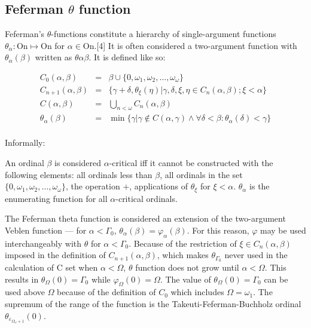 \documentclass[10pt]{article}
\begin{document}
\subsection{Feferman \( \theta \) function}

Feferman's \(\theta\)-functions constitute a hierarchy of single-argument functions \(\theta_\alpha: \text{On} \mapsto \text{On}\) for \(\alpha \in \text{On}\).[4] It is often considered a two-argument function with \(\theta_\alpha(\beta)\) written as \(\theta\alpha\beta\). It is defined like so:

\begin{eqnarray*}
C_0(\alpha, \beta) &=& \beta \cup \{0, \omega_1, \omega_2, \ldots, \omega_\omega\}\\
C_{n+1}(\alpha, \beta) &=& \{\gamma + \delta, \theta_\xi(\eta) | \gamma, \delta, \xi, \eta \in C_n(\alpha, \beta); \xi < \alpha\} \\
C(\alpha, \beta) &=& \bigcup_{n < \omega} C_n (\alpha, \beta) \\
\theta_\alpha(\beta) &=& \min\{\gamma | \gamma \not\in C(\alpha, \gamma) \wedge \forall \delta < \beta: \theta_\alpha(\delta) < \gamma\} \\
\end{eqnarray*}

Informally:

 An ordinal \(\beta\) is considered \(\alpha\)-critical iff it cannot be constructed with the following elements:
 all ordinals less than \(\beta\),
 all ordinals in the set \(\{0, \omega_1, \omega_2, \ldots, \omega_\omega\}\),
 the operation \(+\),
 applications of \(\theta_\xi\) for \(\xi < \alpha\).
 \(\theta_\alpha\) is the enumerating function for all \(\alpha\)-critical ordinals.

The Feferman theta function is considered an extension of the two-argument Veblen function — for \(\alpha < \Gamma_0\), \(\theta_\alpha(\beta) = \varphi_\alpha(\beta)\). For this reason, \(\varphi\) may be used interchangeably with \(\theta\) for \(\alpha < \Gamma_0\). Because of the restriction of \(\xi \in C_n(\alpha, \beta)\) imposed in the definition of \(C_{n+1}(\alpha, \beta)\), which makes \(\theta_{\Gamma_0}\) never used in the calculation of C set when \(\alpha < \Omega\), \(\theta\) function does not grow until \(\alpha < \Omega\). This results in \(\theta_\Omega(0) = \Gamma_0\) while \(\varphi_\Omega(0) = \Omega\). The value of \(\theta_\Omega(0) = \Gamma_0\) can be used above \(\Omega\) because of the definition of \(C_0\) which includes \(\Omega = \omega_1\).
The supremum of the range of the function is the Takeuti-Feferman-Buchholz ordinal \(\theta_{\varepsilon_{\Omega_\omega + 1}}(0)\).
\end{document}
